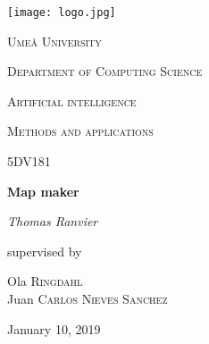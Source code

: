 \begin{titlepage}
    \centering
    \texttt{[image: logo.jpg]} \par\vspace{1cm}
    {\scshape\LARGE Umeå University \par}
    {\scshape\Large Department of Computing Science\par}
    \vspace{1cm}
    {\scshape\Large Artificial intelligence\par}
    {\scshape\Large Methods and applications\par}
    \vspace{0.5cm}
    {\scshape\large 5DV181\par}
    \vspace{1.5cm}
    {\huge\bfseries Map maker\par}
    \vspace{2cm}
    {\Large\itshape Thomas Ranvier\par}
    \vfill 
    {\large supervised by\par}
    Ola \textsc{Ringdahl}
    \\
    Juan \textsc{Carlos Nieves Sanchez}
    \vfill 
    {\large January 10, 2019\par}
\end{titlepage}
